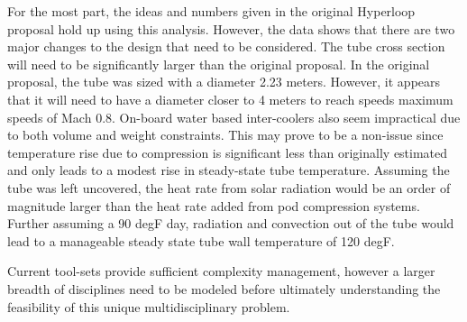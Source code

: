 \documentclass[heading.tex]{subfiles}
\begin{document}
For the most part, the ideas and numbers given in the original Hyperloop proposal hold up using this analysis. However, the data shows that
there are two major changes to the design that need to be considered.
The tube cross section will need to be significantly larger than the original proposal. In the original proposal, the tube was sized with a diameter 2.23
meters. However, it appears that it will need to have a diameter closer to 4 meters to reach speeds maximum speeds of Mach 0.8.
On-board water based inter-coolers also seem impractical due to both volume and weight constraints. This may prove to be a non-issue since
temperature rise due to compression is significant less than originally estimated and only leads to a modest rise in steady-state tube
temperature. Assuming the tube was left uncovered, the heat rate from solar radiation would be an order of magnitude larger than the heat
rate added from pod compression systems. Further assuming a 90 degF day, radiation and convection out of the tube would lead to a
manageable steady state tube wall temperature of 120 degF.

Current tool-sets provide sufficient complexity management, however a larger breadth of disciplines need to be modeled before ultimately
understanding the feasibility of this unique multidisciplinary problem.
\end{document}
